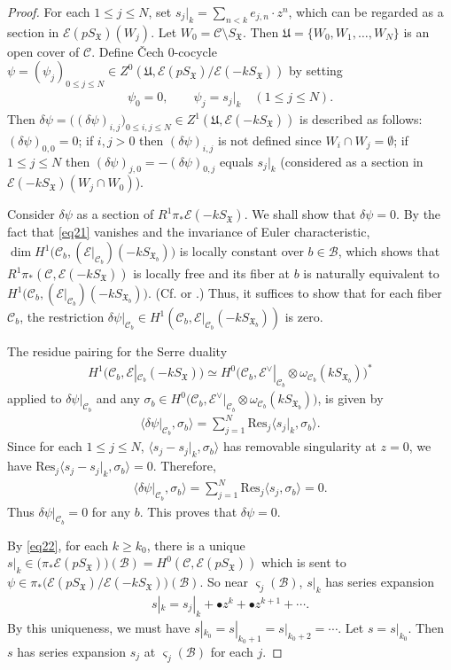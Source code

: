 \documentclass[12pt,a4paper,notitlepage]{article}
\theoremstyle{definition}
\theoremstyle{plain}
\newcommand{\fk}{\mathfrak}
\newcommand{\mc}{\mathcal}
\newcommand{\Res}{\mathrm{Res}}
\newcommand{\bk}[1]{\langle {#1}\rangle}
\newcommand{\scr}{\mathscr}
\newcommand{\sgm}{\varsigma}
\newcommand{\SX}{{S_{\fk X}}}
\numberwithin{equation}{section}
\begin{document}
\begin{proof}
For each $1\leq j\leq N$, set $s_j|_k=\sum_{n<k}e_{j,n}\cdot z^n$, which can be regarded as a section in $\scr E(p\SX)(W_j)$. Let $W_0=\mc C\setminus\SX$. Then $\fk U=\{W_0,W_1,\dots,W_N \}$ is an open cover of $\mc C$. Define \v{C}ech $0$-cocycle $\psi=(\psi_j)_{0\leq j\leq N}\in Z^0(\fk U,\scr E(p\SX)/\scr E(-k\SX))$ by setting
\begin{align*}
\psi_0=0,\qquad\psi_j=s_j|_k \quad(1\leq j\leq N).
\end{align*}
Then $\delta\psi=\big((\delta\psi)_{i,j}\big)_{0\leq i,j\leq N}\in Z^1(\fk U,\scr E(-k\SX))$ is described as follows: $(\delta\psi)_{0,0}=0$; if $i,j>0$ then $(\delta\psi)_{i,j}$ is not defined since $W_i\cap W_j=\emptyset$; if $1\leq j\leq N$ then $(\delta\psi)_{j,0}=-(\delta\psi)_{0,j}$ equals $s_j|_k$ (considered as a section in $\scr E(-k\SX)(W_j\cap W_0)$).
	
Consider $\delta\psi$ as a section of $R^1\pi_*\scr E(-k\SX)$. We shall show that $\delta\psi=0$.  By the fact that \eqref{eq21} vanishes and the invariance of Euler characteristic,  $\dim H^1\big(\mc C_b,(\scr E|_{\mc C_b})(-kS_{\fk X_b})\big)$ is locally constant over $b\in\mc B$, which shows  that $R^1\pi_*(\mc C,\scr E(-k\SX))$ is locally free and its fiber at $b$ is naturally equivalent to $H^1\big(\mc C_b,(\scr E|_{\mc C_b})(-kS_{\fk X_b})\big)$. (Cf. \cite[Thm. III.4.7]{GPR}  or \cite[Thm. III.4.12]{BS76}.) Thus, it suffices to show that for each fiber $\mc C_b$, the restriction $\delta\psi|_{\mc C_b}\in H^1(\mc C_b,\scr E|_{\mc C_b}(-k S_{\fk X_b}))$ is zero.

The residue pairing for the Serre duality
\begin{align*}
H^1(\mc C_b,\scr E|_{\mc C_b}(-k\SX))\simeq H^0\big(\mc C_b,\scr E^\vee|_{\mc C_b}\otimes\omega_{\mc C_b}(kS_{\fk X_b})\big)^*
\end{align*}
applied to $\delta\psi|_{\mc C_b}$ and any $\sigma_b\in H^0\big(\mc C_b,\scr E^\vee|_{\mc C_b}\otimes\omega_{\mc C_b}(kS_{\fk X_b})\big)$, is given by
\begin{align*}
\bk{\delta\psi|_{\mc C_b},\sigma_b}=\sum_{j=1}^N\Res_j\bk{s_j|_k,\sigma_b}.
\end{align*}
Since for each $1\leq j\leq N$, $\bk{s_j-s_j|_k,\sigma_b}$ has removable singularity at $z=0$, we have $\Res_j\bk{s_j-s_j|_k,\sigma_b}=0$. Therefore, 
\begin{align*}
\bk{\delta\psi|_{\mc C_b},\sigma_b}=\sum_{j=1}^N\Res_j\bk{s_j,\sigma_b}=0.
\end{align*}
Thus $\delta\psi|_{\mc C_b}=0$ for any $b$.  This proves that $\delta\psi=0$. 
	
By \eqref{eq22}, for each $k\geq k_0$, there is a unique $s|_k\in\big(\pi_*\scr E(p\SX)\big)(\mc B)= H^0(\mc C,\scr E(p\SX))$ which is sent to $\psi\in \pi_*\big(\scr E(p\SX)/\scr E(-k\SX)\big)(\mc B)$. So near $\sgm_j(\mc B)$, $s|_k$ has series expansion
\begin{align}
s|_k=s_j|_k+\bullet z^k+\bullet z^{k+1}+\cdots.\label{eq23}
\end{align}
By this uniqueness, we must have $s|_{k_0}=s|_{k_0+1}=s|_{k_0+2}=\cdots$. Let $s=s|_{k_0}$. Then $s$ has series expansion $s_j$ at $\sgm_j(\mc B)$ for each $j$.
\end{proof}
\end{document}
